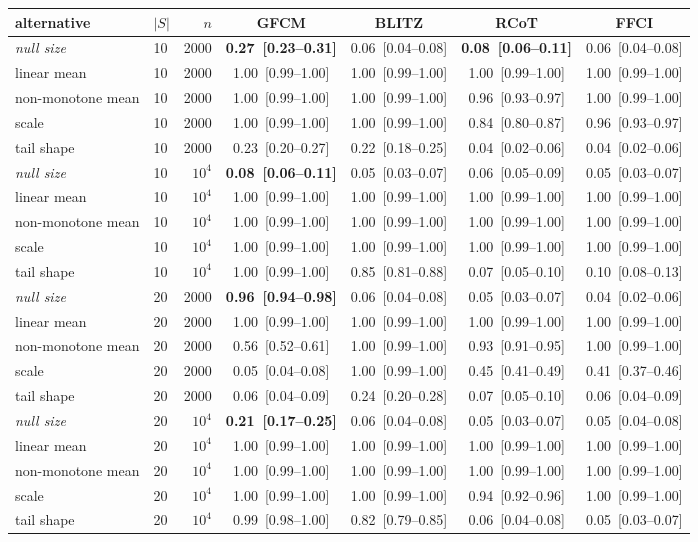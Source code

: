 \begin{tabular}{llrcccc}
\toprule
alternative & $|S|$ & $n$ & \textbf{GFCM} & BLITZ & RCoT & FFCI \\
\midrule
\emph{null size} & 10 & 2000 & \textbf{0.27~[0.23--0.31]} & 0.06~[0.04--0.08] & \textbf{0.08~[0.06--0.11]} & 0.06~[0.04--0.08] \\
linear mean & 10 & 2000 & 1.00~[0.99--1.00] & 1.00~[0.99--1.00] & 1.00~[0.99--1.00] & 1.00~[0.99--1.00] \\
non-monotone mean & 10 & 2000 & 1.00~[0.99--1.00] & 1.00~[0.99--1.00] & 0.96~[0.93--0.97] & 1.00~[0.99--1.00] \\
scale & 10 & 2000 & 1.00~[0.99--1.00] & 1.00~[0.99--1.00] & 0.84~[0.80--0.87] & 0.96~[0.93--0.97] \\
tail shape & 10 & 2000 & 0.23~[0.20--0.27] & 0.22~[0.18--0.25] & 0.04~[0.02--0.06] & 0.04~[0.02--0.06] \\
\midrule
\emph{null size} & 10 & $10^4$ & \textbf{0.08~[0.06--0.11]} & 0.05~[0.03--0.07] & 0.06~[0.05--0.09] & 0.05~[0.03--0.07] \\
linear mean & 10 & $10^4$ & 1.00~[0.99--1.00] & 1.00~[0.99--1.00] & 1.00~[0.99--1.00] & 1.00~[0.99--1.00] \\
non-monotone mean & 10 & $10^4$ & 1.00~[0.99--1.00] & 1.00~[0.99--1.00] & 1.00~[0.99--1.00] & 1.00~[0.99--1.00] \\
scale & 10 & $10^4$ & 1.00~[0.99--1.00] & 1.00~[0.99--1.00] & 1.00~[0.99--1.00] & 1.00~[0.99--1.00] \\
tail shape & 10 & $10^4$ & 1.00~[0.99--1.00] & 0.85~[0.81--0.88] & 0.07~[0.05--0.10] & 0.10~[0.08--0.13] \\
\midrule
\emph{null size} & 20 & 2000 & \textbf{0.96~[0.94--0.98]} & 0.06~[0.04--0.08] & 0.05~[0.03--0.07] & 0.04~[0.02--0.06] \\
linear mean & 20 & 2000 & 1.00~[0.99--1.00] & 1.00~[0.99--1.00] & 1.00~[0.99--1.00] & 1.00~[0.99--1.00] \\
non-monotone mean & 20 & 2000 & 0.56~[0.52--0.61] & 1.00~[0.99--1.00] & 0.93~[0.91--0.95] & 1.00~[0.99--1.00] \\
scale & 20 & 2000 & 0.05~[0.04--0.08] & 1.00~[0.99--1.00] & 0.45~[0.41--0.49] & 0.41~[0.37--0.46] \\
tail shape & 20 & 2000 & 0.06~[0.04--0.09] & 0.24~[0.20--0.28] & 0.07~[0.05--0.10] & 0.06~[0.04--0.09] \\
\midrule
\emph{null size} & 20 & $10^4$ & \textbf{0.21~[0.17--0.25]} & 0.06~[0.04--0.08] & 0.05~[0.03--0.07] & 0.05~[0.04--0.08] \\
linear mean & 20 & $10^4$ & 1.00~[0.99--1.00] & 1.00~[0.99--1.00] & 1.00~[0.99--1.00] & 1.00~[0.99--1.00] \\
non-monotone mean & 20 & $10^4$ & 1.00~[0.99--1.00] & 1.00~[0.99--1.00] & 1.00~[0.99--1.00] & 1.00~[0.99--1.00] \\
scale & 20 & $10^4$ & 1.00~[0.99--1.00] & 1.00~[0.99--1.00] & 0.94~[0.92--0.96] & 1.00~[0.99--1.00] \\
tail shape & 20 & $10^4$ & 0.99~[0.98--1.00] & 0.82~[0.79--0.85] & 0.06~[0.04--0.08] & 0.05~[0.03--0.07] \\
\bottomrule
\end{tabular}
